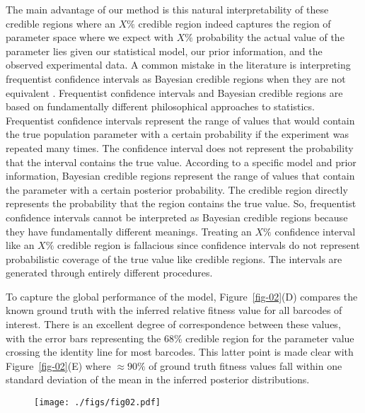 \documentclass[
  letterpaper,
  DIV=11,
  numbers=noendperiod]{scrartcl}
\begin{document}
\begin{refsegment}
The main advantage of our method is this natural interpretability of
these credible regions where an \(X\%\) credible region indeed captures
the region of parameter space where we expect with \(X\%\) probability
the actual value of the parameter lies given our statistical model, our
prior information, and the observed experimental data. A common mistake
in the literature is interpreting frequentist confidence intervals as
Bayesian credible regions when they are not equivalent
\autocite{morey2016}. Frequentist confidence intervals and Bayesian
credible regions are based on fundamentally different philosophical
approaches to statistics. Frequentist confidence intervals represent the
range of values that would contain the true population parameter with a
certain probability if the experiment was repeated many times. The
confidence interval does not represent the probability that the interval
contains the true value. According to a specific model and prior
information, Bayesian credible regions represent the range of values
that contain the parameter with a certain posterior probability. The
credible region directly represents the probability that the region
contains the true value. So, frequentist confidence intervals cannot be
interpreted as Bayesian credible regions because they have fundamentally
different meanings. Treating an \(X\%\) confidence interval like an
\(X\%\) credible region is fallacious since confidence intervals do not
represent probabilistic coverage of the true value like credible
regions. The intervals are generated through entirely different
procedures.

To capture the global performance of the model, Figure~\ref{fig-02}(D)
compares the known ground truth with the inferred relative fitness value
for all barcodes of interest. There is an excellent degree of
correspondence between these values, with the error bars representing
the 68\% credible region for the parameter value crossing the identity
line for most barcodes. This latter point is made clear with
Figure~\ref{fig-02}(E) where \(\approx 90\%\) of ground truth fitness
values fall within one standard deviation of the mean in the inferred
posterior distributions.

\begin{figure}

{\centering \texttt{[image: ./figs/fig02.pdf]}

}


\end{figure}
\end{refsegment}
\end{document}
